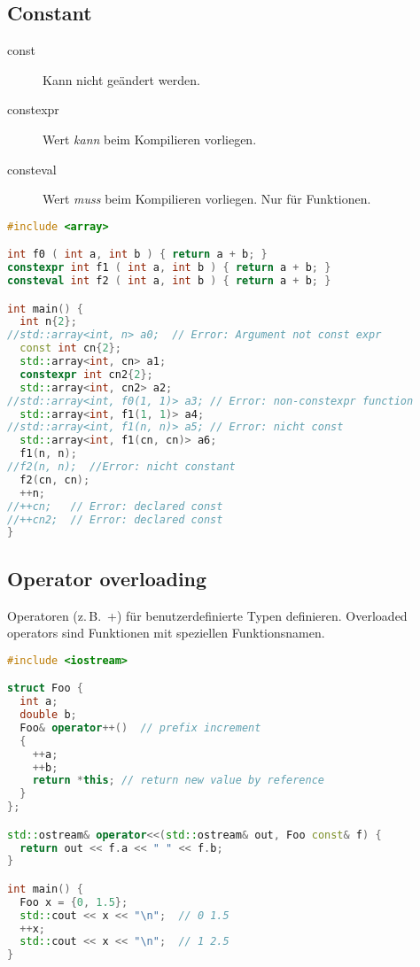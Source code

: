 \documentclass[10pt,twocolumn]{scrartcl}
\begin{document}
\subsection{Constant}
\label{sec:Ausdruck:constant}

\begin{description}
  \item[const] Kann nicht geändert werden.
  \item[constexpr] Wert \emph{kann} beim Kompilieren vorliegen.
  \item[consteval] Wert \emph{muss} beim Kompilieren vorliegen. Nur für Funktionen.
\end{description}

\begin{lstlisting}[language=C++]
#include <array>

int f0 ( int a, int b ) { return a + b; }
constexpr int f1 ( int a, int b ) { return a + b; }
consteval int f2 ( int a, int b ) { return a + b; }

int main() {
  int n{2};
//std::array<int, n> a0;  // Error: Argument not const expr
  const int cn{2};
  std::array<int, cn> a1;
  constexpr int cn2{2};
  std::array<int, cn2> a2;
//std::array<int, f0(1, 1)> a3; // Error: non-constexpr function
  std::array<int, f1(1, 1)> a4;
//std::array<int, f1(n, n)> a5; // Error: nicht const
  std::array<int, f1(cn, cn)> a6;
  f1(n, n);
//f2(n, n);  //Error: nicht constant
  f2(cn, cn);
  ++n;
//++cn;   // Error: declared const
//++cn2;  // Error: declared const
}
\end{lstlisting}

\subsection{Operator overloading}

Operatoren (z.\,B.\ +) für benutzerdefinierte Typen definieren. Overloaded operators sind Funktionen mit speziellen Funktionsnamen.

\begin{lstlisting}[language=C++]
#include <iostream>

struct Foo {
  int a;
  double b;
  Foo& operator++()  // prefix increment
  {
    ++a;
    ++b;
    return *this; // return new value by reference
  }
};

std::ostream& operator<<(std::ostream& out, Foo const& f) {
  return out << f.a << " " << f.b;
}

int main() {
  Foo x = {0, 1.5};
  std::cout << x << "\n";  // 0 1.5
  ++x;
  std::cout << x << "\n";  // 1 2.5
}
\end{lstlisting}
\end{document}
